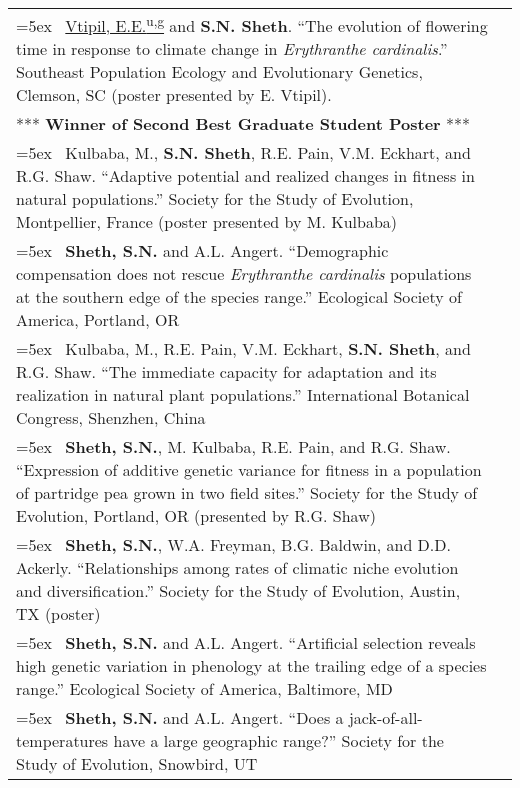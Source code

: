 \documentclass[11pt,english]{article}
\providecommand{\tabularnewline}{\\}
\begin{document}
\begin{tabularx}{\textwidth}{@{}>{\raggedright}p{5.25in} >{\raggedleft}X@{}}

\hangindent=5ex \ \underline{Vtipil, E.E.\textsuperscript{u,g}} and \textbf{S.N. Sheth}. ``The evolution of flowering time in response to climate change in \emph{Erythranthe cardinalis}.'' Southeast Population Ecology and Evolutionary Genetics, Clemson, SC (poster presented by E. Vtipil). & 2019 \tabularnewline
\hspace{7mm} *** \textbf{Winner of Second Best Graduate Student Poster} *** \tabularnewline

\hangindent=5ex \ Kulbaba, M., \textbf{S.N. Sheth}, R.E. Pain, V.M. Eckhart, and R.G. Shaw. ``Adaptive potential and realized changes in fitness in natural populations.'' Society for the Study of Evolution, Montpellier, France (poster presented by M. Kulbaba) & 2018 \tabularnewline

\hangindent=5ex \ \textbf{Sheth, S.N.} and A.L. Angert. ``Demographic compensation does not rescue \textit{Erythranthe cardinalis} populations at the southern edge of the species range.'' Ecological Society of America, Portland, OR & 2017 \tabularnewline

\hangindent=5ex \ Kulbaba, M., R.E. Pain, V.M. Eckhart, \textbf{S.N. Sheth}, and R.G. Shaw. ``The immediate capacity for adaptation and its realization in natural plant populations.'' International Botanical Congress, Shenzhen, China & 2017 \tabularnewline

\hangindent=5ex \ \textbf{Sheth, S.N.}, M. Kulbaba, R.E. Pain, and R.G. Shaw. ``Expression of additive genetic variance for fitness in a population of partridge pea grown in two field sites.'' Society for the Study of Evolution, Portland, OR (presented by R.G. Shaw) & 2017 \tabularnewline

\hangindent=5ex \ \textbf{Sheth, S.N.}, W.A. Freyman, B.G. Baldwin, and D.D. Ackerly. ``Relationships among rates of climatic niche evolution and diversification.'' Society for the Study of Evolution, Austin, TX (poster) & 2016 \tabularnewline


\hangindent=5ex \ \textbf{Sheth, S.N.} and A.L. Angert. ``Artificial selection reveals high genetic variation in phenology at the trailing edge of a species range.'' Ecological Society of America, Baltimore, MD & 2015 \tabularnewline

\hangindent=5ex \ \textbf{Sheth, S.N.} and A.L. Angert. ``Does a jack-of-all-temperatures have a large geographic range?'' Society for the Study of Evolution, Snowbird, UT & 2013 \tabularnewline


\end{tabularx}
\end{document}
